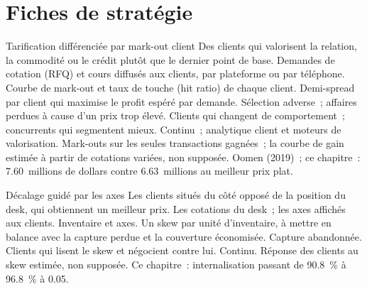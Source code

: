 \section{Fiches de stratégie}

\begin{strategyfile}{Tarification différenciée par mark-out client}\label{strat:s2:flow-market-making-at-a-bank:tier}
 Des clients qui valorisent la relation, la commodité ou le crédit plutôt que le dernier point de base.
 Demandes de cotation (RFQ) et cours diffusés aux clients, par plateforme ou par téléphone.
 Courbe de mark-out et taux de touche (hit ratio) de chaque client.
 Demi-spread par client qui maximise le profit espéré par demande.
 Sélection adverse~; affaires perdues à cause d'un prix trop élevé.
 Clients qui changent de comportement~; concurrents qui segmentent mieux.
 Continu~; analytique client et moteurs de valorisation.
 Mark-outs sur les seules transactions gagnées~; la courbe de gain estimée à partir de cotations variées, non supposée.
 Oomen (2019)~; ce chapitre~: 7.60~millions de dollars contre 6.63~millions au meilleur prix plat.
\end{strategyfile}

\begin{strategyfile}{Décalage guidé par les axes}\label{strat:s2:flow-market-making-at-a-bank:skew}
 Les clients situés du côté opposé de la position du desk, qui obtiennent un meilleur prix.
 Les cotations du desk~; les axes affichés aux clients.
 Inventaire et axes.
 Un skew par unité d'inventaire, à mettre en balance avec la capture perdue et la couverture économisée.
 Capture abandonnée.
 Clients qui lisent le skew et négocient contre lui.
 Continu.
 Réponse des clients au skew estimée, non supposée.
 Ce chapitre~: internalisation passant de 90.8~\% à 96.8~\% à 0.05.
\end{strategyfile}

